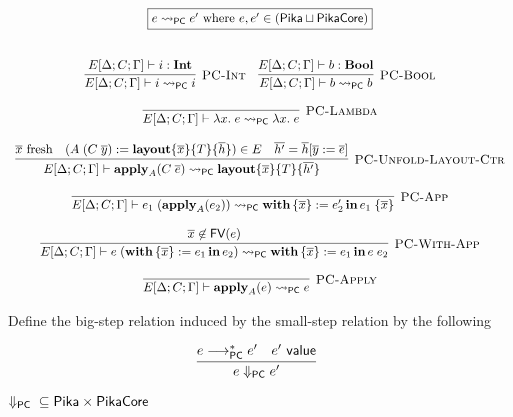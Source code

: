 \[
  \begin{array}{c}
    \fbox{$e \pcNotionStep e'\textrm{ where $e, e' \in (\Pika \sqcup \PikaCore)$}$}
    \fboxNewlines
    \labinfer[PC-Int]{E[\Delta;C;\Gamma] \vdash i \pcNotionStep i}{E[\Delta;C;\Gamma] \vdash i : \Int}
    ~~~
    \labinfer[PC-Bool]{E[\Delta;C;\Gamma] \vdash b \pcNotionStep b}{E[\Delta;C;\Gamma] \vdash b : \Bool}
    \\\\
    \labinfer[PC-Lambda]{E[\Delta;C;\Gamma] \vdash \lambda x.\; e \pcNotionStep \lambda x.\; e}{}
    \\\\
    \labinfer[PC-Unfold-Layout-Ctr]{E[\Delta;C;\Gamma] \vdash \apply_A(C\; \overline{e}) \pcNotionStep \sslmath{\overline{x}}{T}{\overline{h'}}}
      {\fresh{\overline{x}}
      & (A\; (C\; \overline{y}) := \sslmath{\overline{x}}{T}{\overline{h}}) \in E
      & \overline{h'} = \overline{h}[\overline{y} := \overline{e}]
      }
    \\\\
    \labinfer[PC-App]{E[\Delta;C;\Gamma] \vdash e_1\;(\apply_A(e_2)) \pcNotionStep \withIn{\{ \overline{x} \} := e_2'} e_1\; \{\overline{x}\}}
      {}
    \\\\
    \labinfer[PC-With-App]{E[\Delta;C;\Gamma] \vdash e\; (\withIn{\{ \overline{x} \} := e_1} e_2) \pcNotionStep \withIn{\{ \overline{x} \} := e_1} e\; e_2}
      {\overline{x} \not\in \FV(e)}
    \\\\
    \labinfer[PC-Apply]{E[\Delta;C;\Gamma] \vdash \apply_A(e) \pcNotionStep e}
      {}
  \end{array}
\]

Define the big-step relation induced by the small-step relation by the following

\[
  \begin{array}{c}
    \labinfer{e \pcStep e'}
      {e \pcsteps e' & e' ~\val}
  \end{array}
\]

\begin{theorem} $\Downarrow_{\textsf{PC}}{} \subseteq \textsf{Pika} \times \textsf{PikaCore}$
\end{theorem}

